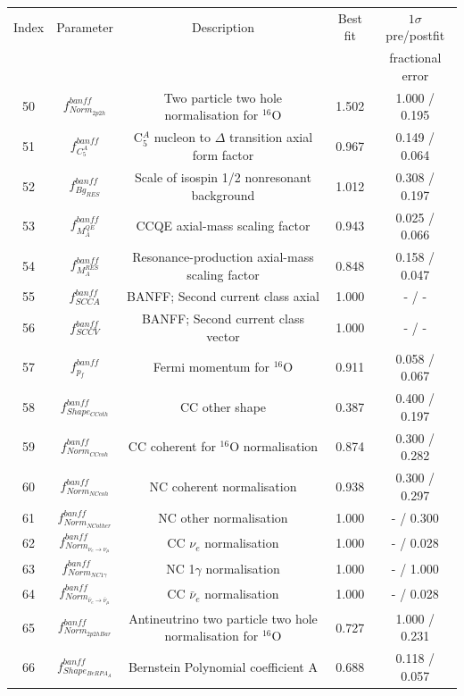 \begin{tabular} { | c | c | c | c | c |  }
\hline 
Index & Parameter & Description & Best fit & $1\sigma$ pre/postfit\\ 
 & &  &  & fractional error\\
\hline 
50 & $f_{Norm_{2p2h}}^{banff}$ & Two particle two hole normalisation for $^{16}$O & 1.502 & 1.000 / 0.195\\ 
51 & $f_{C^{A}_{5}}^{banff}$ & C$^{A}_{5}$ nucleon to $\Delta$ transition axial form factor & 0.967 & 0.149 / 0.064\\ 
52 & $f_{Bg_{RES}}^{banff}$ & Scale of isospin 1/2 nonresonant background & 1.012 & 0.308 / 0.197\\ 
53 & $f_{M_A^{QE}}^{banff}$ & CCQE axial-mass scaling factor & 0.943 & 0.025 / 0.066\\ 
54 & $f_{M_A^{RES}}^{banff}$ & Resonance-production axial-mass scaling factor & 0.848 & 0.158 / 0.047\\ 
55 & $f_{SCCA}^{banff}$ & BANFF; Second current class axial & 1.000 & - / -\\ 
56 & $f_{SCCV}^{banff}$ & BANFF; Second current class vector & 1.000 & - / -\\ 
57 & $f_{p_{f}}^{banff}$ & Fermi momentum for $^{16}$O & 0.911 & 0.058 / 0.067\\ 
58 & $f_{Shape_{CCoth}}^{banff}$ & CC other shape & 0.387 & 0.400 / 0.197\\ 
59 & $f_{Norm_{CCcoh}}^{banff}$ & CC coherent for $^{16}$O normalisation & 0.874 & 0.300 / 0.282\\ 
60 & $f_{Norm_{NCcoh}}^{banff}$ & NC coherent normalisation & 0.938 & 0.300 / 0.297\\ 
61 & $f_{Norm_{NCother}}^{banff}$ & NC other normalisation & 1.000 & - / 0.300\\ 
62 & $f_{Norm_{\nu_e \rightarrow \nu_\mu}}^{banff}$ & CC $\nu_{e}$ normalisation & 1.000 & - / 0.028\\ 
63 & $f_{Norm_{NC1\gamma}}^{banff}$ & NC 1$\gamma$ normalisation & 1.000 & - / 1.000\\ 
64 & $f_{Norm_{\bar{\nu}_e \rightarrow \bar{\nu}_{\mu}}}^{banff}$ & CC $\bar{\nu}_{e}$ normalisation & 1.000 & - / 0.028\\ 
65 & $f_{Norm_{2p2hBar}}^{banff}$ & Antineutrino two particle two hole normalisation for $^{16}$O & 0.727 & 1.000 / 0.231\\ 
66 & $f_{Shape_{BeRPA_{A}}}^{banff}$ & Bernstein Polynomial coefficient A & 0.688 & 0.118 / 0.057\\ 

\end{tabular}
